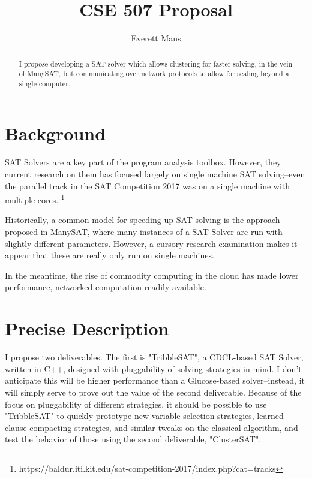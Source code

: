 \documentclass[10pt]{article}
\title{CSE 507 Proposal}
\author{Everett Maus}
\begin{document}
\maketitle

\begin{abstract}
  I propose developing a SAT solver which allows clustering for faster solving, in the 
  vein of ManySAT, but communicating over network protocols to allow for scaling beyond
  a single computer.
\end{abstract}

\section{Background}
SAT Solvers are a key part of the program analysis toolbox.  However, they current research on
  them has focused largely on single machine SAT solving--even the parallel track in the SAT 
  Competition 2017 was on a single machine with multiple cores. \footnote{https://baldur.iti.kit.edu/sat-competition-2017/index.php?cat=tracks}

  Historically, a common model for speeding up SAT solving is the approach proposed in ManySAT,
  where many instances of a SAT Solver are run with slightly different parameters.  However,
  a cursory research examination makes it appear that these are really only run on single machines.

  In the meantime, the rise of commodity computing in the cloud has made lower performance, networked
  computation readily available.

\section{Precise Description}

  I propose two deliverables.  The first is "TribbleSAT", a CDCL-based SAT Solver, 
  written in C++, designed with pluggability of solving strategies in mind.  I don't anticipate
  this will be higher performance than a Glucose-based solver--instead, it will simply serve to
  prove out the value of the second deliverable.  Because of the focus on pluggability of different
  strategies, it should be possible to use "TribbleSAT" to quickly prototype new variable
  selection strategies, learned-clause compacting strategies, and similar tweaks on the classical
  algorithm, and test the behavior of those using the second deliverable, "ClusterSAT".
\end{document}
